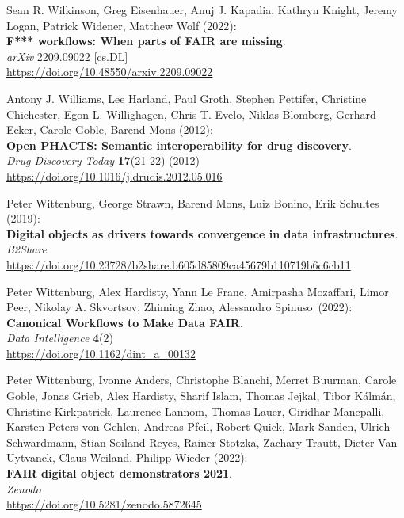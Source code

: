 \begin{thebibliography}{9}
Sean R. Wilkinson, Greg Eisenhauer, Anuj J. Kapadia, Kathryn Knight,
Jeremy Logan, Patrick Widener, Matthew Wolf (2022): \\
\textbf{F*** workflows: When parts of {FAIR} are missing}. \\
\emph{arXiv} 2209.09022 [cs.DL] \\
\url{https://doi.org/10.48550/arxiv.2209.09022}

Antony J. Williams, Lee Harland, Paul Groth, Stephen Pettifer, Christine
Chichester, Egon L. Willighagen, Chris T. Evelo, Niklas Blomberg,
Gerhard Ecker, Carole Goble, Barend Mons (2012): \\
\textbf{Open {PHACTS}: Semantic interoperability for drug discovery}.\\
\emph{Drug Discovery Today} \textbf{17}(21-22) (2012) \\
\url{https://doi.org/10.1016/j.drudis.2012.05.016}

Peter Wittenburg, George Strawn, Barend Mons, Luiz Bonino, Erik
Schultes (2019): \\
\textbf{Digital objects as drivers towards convergence in data
infrastructures}. \\
\emph{B2Share}\\
\url{https://doi.org/10.23728/b2share.b605d85809ca45679b110719b6c6cb11}

Peter Wittenburg, Alex Hardisty, Yann Le Franc, Amirpasha Mozaffari, Limor Peer, Nikolay A. Skvortsov, Zhiming Zhao, Alessandro Spinuso~(2022):\\
\textbf{Canonical Workflows to Make Data FAIR}.\\
\emph{Data Intelligence} \textbf{4}(2)\\
\url{https://doi.org/10.1162/dint_a_00132}

Peter Wittenburg, Ivonne Anders, Christophe Blanchi, Merret Buurman,
Carole Goble, Jonas Grieb, Alex Hardisty, Sharif Islam, Thomas Jejkal,
Tibor Kálmán, Christine Kirkpatrick, Laurence Lannom, Thomas Lauer,
Giridhar Manepalli, Karsten Peters-von Gehlen, Andreas Pfeil, Robert
Quick, Mark Sanden, Ulrich Schwardmann, Stian Soiland-Reyes, Rainer
Stotzka, Zachary Trautt, Dieter Van Uytvanck, Claus Weiland, Philipp
Wieder (2022): \\
\textbf{FAIR digital object demonstrators 2021}.\\
\emph{Zenodo}\\
\url{https://doi.org/10.5281/zenodo.5872645}


\end{thebibliography}
